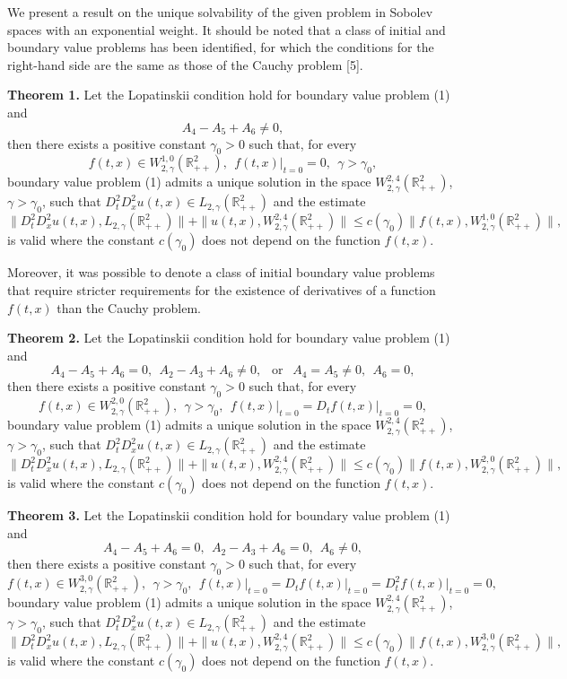 \documentclass[12pt]{llncs}
\begin{document}
We present a result on the unique solvability of the given problem in Sobolev spaces with an exponential weight. It should be noted that a class of initial and boundary value problems has been identified, for which the conditions for the right-hand side are the same as those of the Cauchy problem [5]. 

{\bf Theorem 1.} 
Let the Lopatinskii condition hold for boundary value problem (1) and 
$$
A_4-A_5+A_6\ne 0,
$$
then there exists a positive constant $\gamma_0>0$ such that, for every
$$
f(t,x)\in W_{2,\gamma}^{1,0}(\mathbb{R}^2_{++}), \ \ f(t,x)\bigr|_{t=0}=0, \ \ \gamma>\gamma_0,
$$
boundary value problem (1)  admits a unique solution in the space $W_{2,\gamma}^{2,4}(\mathbb{R}^2_{++})$, $\gamma>\gamma_0$, such that $D_t^2 D_x^2 u(t,x)\in L_{2,\gamma}(\mathbb{R}^2_{++})$ and the estimate
$$
\|D_t^2 D_x^2 u(t, x), L_{2,\gamma}(\mathbb{R}^2_{++})\|+\|u(t, x), W_{2,\gamma}^{2,4}(\mathbb{R}^2_{++})\|\le c(\gamma_0) \|f(t,x),  W_{2,\gamma}^{1,0}(\mathbb{R}^2_{++})\|,
$$
is valid where the constant $c(\gamma_0)$  does not depend on the function $f(t,x)$.

Moreover, it was possible to denote a class of initial boundary value problems that require stricter requirements for the existence of derivatives of a function $f(t,x)$ than the Cauchy problem.

{\bf Theorem 2.} 
Let the Lopatinskii condition hold for boundary value problem (1) and 
$$
A_4-A_5+A_6= 0, \ \  A_2-A_3+A_6\ne 0, \ \ \mbox{ or } \ \
A_4=A_5\ne 0, \ \ A_6=0,
$$
then there exists a positive constant $\gamma_0>0$ such that, for every
$$
f(t, x)\in W_{2,\gamma}^{2,0}(\mathbb{R}^2_{++}), \ \ \gamma>\gamma_0, \ \
f(t, x)\bigr|_{t=0}=D_t f(t, x)\bigr|_{t=0}=0,
$$
boundary value problem (1)  admits a unique solution in the space $W_{2,\gamma}^{2,4}(\mathbb{R}^2_{++})$, $\gamma>\gamma_0$, such that $D_t^2 D_x^2 u(t,x)\in L_{2,\gamma}(\mathbb{R}^2_{++})$ and the estimate
$$
\|D_t^2 D_x^2 u(t, x), L_{2,\gamma}(\mathbb{R}^2_{++})\|+\|u(t, x), W_{2,\gamma}^{2,4}(\mathbb{R}^2_{++})\|\le c(\gamma_0) \|f(t,x),  W_{2,\gamma}^{2,0}(\mathbb{R}^2_{++})\|,
$$
is valid where the constant $c(\gamma_0)$  does not depend on the function $f(t,x)$.

{\bf Theorem 3.} 
Let the Lopatinskii condition hold for boundary value problem (1) and 
$$
A_4-A_5+A_6= 0, \ \  A_2-A_3+A_6= 0, \ \ A_6\ne 0,
$$
then there exists a positive constant $\gamma_0>0$ such that, for every
$$
f(t, x)\in W_{2,\gamma}^{3,0}(\mathbb{R}^2_{++}), \ \ \gamma>\gamma_0, \ \
f(t, x)\bigr|_{t=0}=D_t f(t, x)\bigr|_{t=0}=D^2_t f(t, x)\bigr|_{t=0}=0,
$$
boundary value problem (1)  admits a unique solution in the space $W_{2,\gamma}^{2,4}(\mathbb{R}^2_{++})$, $\gamma>\gamma_0$, such that $D_t^2 D_x^2 u(t,x)\in L_{2,\gamma}(\mathbb{R}^2_{++})$ and the estimate
$$
\|D_t^2 D_x^2 u(t, x), L_{2,\gamma}(\mathbb{R}^2_{++})\|+\|u(t, x), W_{2,\gamma}^{2,4}(\mathbb{R}^2_{++})\|\le c(\gamma_0) \|f(t,x),  W_{2,\gamma}^{3,0}(\mathbb{R}^2_{++})\|,
$$
is valid where the constant $c(\gamma_0)$  does not depend on the function $f(t,x)$.
\end{document}
